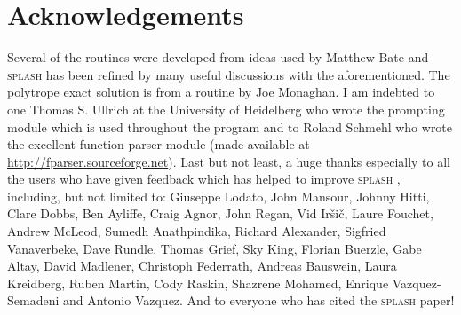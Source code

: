 \documentclass[a4paper,10pt]{article}
\newcommand{\splash}{\textsc{splash }}
\begin{document}
\section*{Acknowledgements}
 Several of the routines were developed from ideas used by Matthew Bate and \splash has been refined by many useful discussions with the aforementioned. The
polytrope exact solution is from a routine by Joe Monaghan. I am indebted to one Thomas S. Ullrich at the University of Heidelberg who wrote the prompting module
which is used throughout the program and to Roland Schmehl who wrote the excellent function parser module (made available at \url{http://fparser.sourceforge.net}). Last but not least, a huge thanks especially to all the users who have given feedback which has helped to improve \splash, including, but not limited to: Giuseppe Lodato, John Mansour, Johnny Hitti, Clare Dobbs, Ben Ayliffe, Craig Agnor, John Regan, Vid Ir\v{s}i\v{c}, Laure Fouchet, Andrew McLeod, Sumedh Anathpindika, Richard Alexander, Sigfried Vanaverbeke, Dave Rundle, Thomas Grief, Sky King, Florian Buerzle, Gabe Altay, David Madlener, Christoph Federrath, Andreas Bauswein, Laura Kreidberg, Ruben Martin, Cody Raskin, Shazrene Mohamed, Enrique Vazquez-Semadeni and Antonio Vazquez. And to everyone who has cited the \splash paper!

\newpage
\appendix
\end{document}
